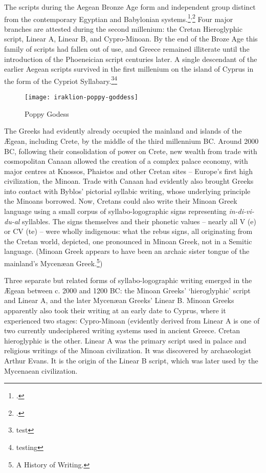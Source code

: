 The scripts during the Aegean Bronze Age form and independent group distinct from the
contemporary Egyptian and Babylonian systems.\footcite{packard1974}\textsuperscript{,}\footcite{booktabs} Four major branches are attested during the
second millenium: the Cretan Hieroglyphic script, Linear A, Linear B, and Cypro-Minoan.  By the end of the Broze Age this family of scripts had fallen out of use, and Greece remained illiterate until the introduction of the Phoeneician script centuries later. A single descendant of the earlier Aegean scripts survived in the first millenium on the island of Cyprus in the form of the Cypriot Syllabary.\footnote{test}\footnote{testing} \label{s:lineara}

\begin{figure}[htbp]
\centering
\texttt{[image: iraklion-poppy-goddess]}
\caption{Poppy Godess}
\end{figure}

The Greeks had evidently already occupied the mainland and islands of the
Ægean, including Crete, by the middle of the third millennium
BC. Around 2000 BC, following their consolidation of power on
Crete, new wealth from trade with cosmopolitan Canaan
allowed the creation of a complex palace economy, with major
centres at Knossos, Phaistos and other Cretan sites – Europe’s
first high civilization, the Minoan. Trade with Canaan had evidently
also brought Greeks into contact with Byblos’ pictorial
syllabic writing, whose underlying principle the Minoans borrowed.
Now, Cretans could also write their Minoan Greek language
using a small corpus of syllabo-logographic signs
representing \textit{in-di-vi-du-al} syllables. The signs themselves and
their phonetic values – nearly all V (e) or CV (te) – were wholly
indigenous: what the rebus signs, all originating from the
Cretan world, depicted, one pronounced in Minoan Greek, not
in a Semitic language. (Minoan Greek appears to have been an
archaic sister tongue of the mainland’s Mycenæan Greek.\footnote{A History of Writing. })

Three separate but related forms of syllabo-logographic
writing emerged in the Ægean between c. 2000 and 1200 BC: the
Minoan Greeks’ ‘hieroglyphic’ script and Linear A, and the
later Mycenæan Greeks’ Linear B. Minoan Greeks apparently
also took their writing at an early date to Cyprus, where it experienced
two stages: Cypro-Minoan (evidently derived from
Linear A is one of two currently undeciphered writing systems used in ancient Greece. Cretan hieroglyphic is the other. Linear A was the primary script used in palace and religious writings of the Minoan civilization. It was discovered by archaeologist Arthur Evans. It is the origin of the Linear B script, which was later used by the Mycenaean civilization.

